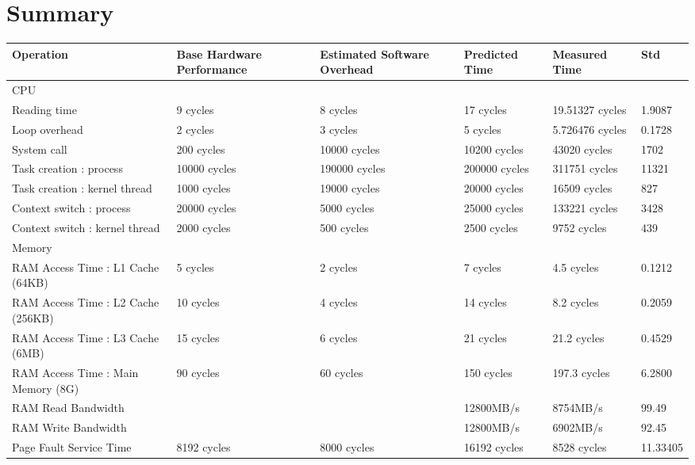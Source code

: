\chapter{Summary}

\small
\begin{center}
\begin{tabular}{| p{4cm} | p{2cm} | p{2cm} | p{2cm} | p{2.5cm} | p{2cm} }
\hline
Operation  & Base Hardware Performance  & Estimated Software Overhead  & Predicted Time  & Measured Time  & Std \\
\hline 
CPU & & & & &\\
\hline
Reading time & 9 cycles & 8 cycles & 17 cycles & 19.51327 cycles & 1.9087\\
Loop overhead & 2 cycles& 3 cycles& 5 cycles& 5.726476 cycles & 0.1728 \\
System call & 200 cycles& 10000 cycles& 10200 cycles& 43020 cycles & 1702 \\
Task creation : process & 10000 cycles& 190000 cycles& 200000 cycles& 311751 cycles & 11321\\
Task creation : kernel thread    & 1000 cycles& 19000 cycles& 20000 cycles& 16509 cycles & 827\\
Context switch : process & 20000 cycles& 5000 cycles& 25000 cycles& 133221  cycles & 3428\\
Context switch : kernel thread    & 2000 cycles& 500 cycles& 2500 cycles& 9752 cycles & 439\\
\hline 
Memory & & & & &\\
\hline
RAM Access Time : L1 Cache (64KB) &   5 cycles  & 2 cycles & 7 cycles &  4.5 cycles & 0.1212 \\
RAM Access Time : L2 Cache (256KB) & 10 cycles & 4 cycles & 14 cycles &  8.2 cycles & 0.2059\\
RAM Access Time : L3 Cache (6MB) & 15 cycles & 6 cycles & 21 cycles  & 21.2 cycles & 0.4529\\
RAM Access Time : Main Memory (8G) & 90 cycles & 60 cycles & 150 cycles & 197.3 cycles & 6.2800\\
RAM Read Bandwidth & & & 12800MB/s & 8754MB/s & 99.49 \\
RAM Write Bandwidth & & & 12800MB/s & 6902MB/s & 92.45\\
Page Fault Service Time & 8192 cycles& 8000 cycles& 16192 cycles& 8528 cycles & 11.33405\\
\end{tabular}
\end{center}

